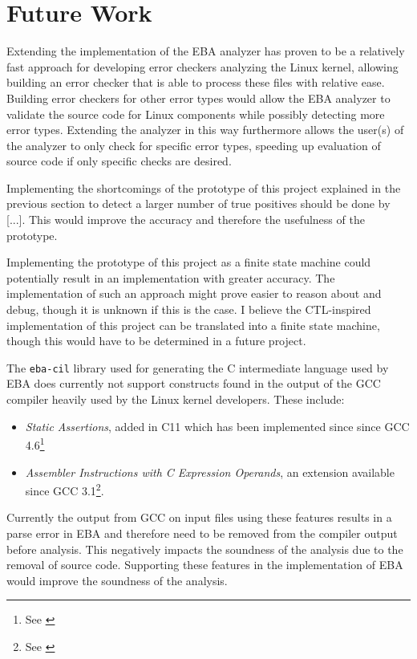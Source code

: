 \section{Future Work}

\newpar Extending the implementation of the EBA analyzer has proven to be a relatively fast approach for developing error checkers analyzing the Linux kernel, allowing building an error checker that is able to process these files with relative ease. 
Building error checkers for other error types would allow the EBA analyzer to validate the source code for Linux components while possibly detecting more error types. Extending the analyzer in this way furthermore allows the user(s) of the analyzer to only check for specific error types, speeding up evaluation of source code if only specific checks are desired. 

\newpar Implementing the shortcomings of the prototype of this project explained in the previous section to detect a larger number of true positives should be done by  [...]. This would improve the accuracy and therefore the usefulness of the prototype.

\newpar Implementing the prototype of this project as a finite state machine could potentially result in an implementation with greater accuracy. The implementation of such an approach might prove easier to reason about and debug, though it is unknown if this is the case. I believe the CTL-inspired implementation of this project can be translated into a finite state machine, though this would have to be determined in a future project.

\newpar The \texttt{eba-cil} library used for generating the C intermediate language used by EBA does currently not support constructs found in the output of the GCC compiler heavily used by the Linux kernel developers. These include:
\begin{itemize}
    \item \textit{Static Assertions}, added in C11 which has been implemented since since GCC 4.6\footnote{See \cite{ISO:2011:IIIb}}
    \item \textit{Assembler Instructions with C Expression Operands}, an extension available since GCC 3.1\footnote{See \cite{GCC:3.1}}.
\end{itemize}

\noindent Currently the output from GCC on input files using these features results in a parse error in EBA and therefore need to be removed from the compiler output before analysis. This negatively impacts the soundness of the analysis due to the removal of source code. Supporting these features in the implementation of EBA would improve the soundness of the analysis.